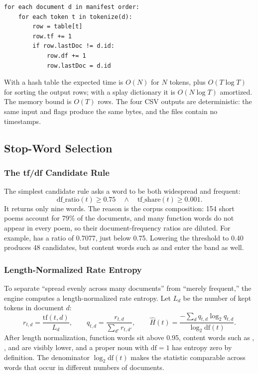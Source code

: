 \begin{lstlisting}[style=cli]
for each document d in manifest order:
    for each token t in tokenize(d):
        row = table[t]
        row.tf += 1
        if row.lastDoc != d.id:
            row.df += 1
            row.lastDoc = d.id
\end{lstlisting}

With a hash table the expected time is $O(N)$ for $N$ tokens, plus $O(T\log T)$
for sorting the output rows; with a splay dictionary it is $O(N\log T)$
amortized. The memory bound is $O(T)$ rows. The four CSV outputs are
deterministic: the same input and flags produce the same bytes, and the files
contain no timestamps.

\subsection{Stop-Word Selection}
\label{sec:stopwords}

\subsubsection{The tf/df Candidate Rule}

The simplest candidate rule asks a word to be both widespread and frequent:
\begin{equation}
  \mathrm{df\_ratio}(t)\ge 0.75
  \quad\land\quad
  \mathrm{tf\_share}(t)\ge 0.001.
\end{equation}
It returns only nine words. The reason is the corpus composition: 154 short
poems account for 79\% of the documents, and many function words do not appear
in every poem, so their document-frequency ratios are diluted. For example,
 has a ratio of 0.7077, just below 0.75. Lowering the threshold to 0.40
produces 48 candidates, but content words such as  and 
enter the band as well.

\subsubsection{Length-Normalized Rate Entropy}
\label{sec:entropy}

To separate ``spread evenly across many documents'' from ``merely frequent,''
the engine computes a length-normalized rate entropy. Let $L_d$ be the number
of kept tokens in document $d$:
\begin{equation}
  r_{t,d}=\frac{\mathrm{tf}(t,d)}{L_d},\qquad
  q_{t,d}=\frac{r_{t,d}}{\sum_{d'}r_{t,d'}},\qquad
  \widehat H(t)=\frac{-\sum_{d}q_{t,d}\log_2 q_{t,d}}{\log_2\mathrm{df}(t)}.
  \label{eq:rate-entropy}
\end{equation}
After length normalization, function words sit above 0.95, content words such
as , , and  are visibly lower, and a proper
noun with $\mathrm{df}=1$ has entropy zero by definition. The denominator
$\log_2\mathrm{df}(t)$ makes the statistic comparable across words that occur
in different numbers of documents.

